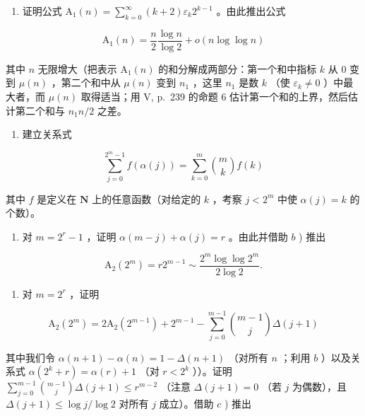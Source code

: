 \begin{enumerate}
\def\labelenumi{\alph{enumi})}
\tightlist
\item
  证明公式 \(\mathrm{A}_1(n) = \sum_{k=0}^{\infty}(k+2)\varepsilon_k 2^{k-1}\) 。由此推出公式
\end{enumerate}

\[
\mathrm{A} _ {1} (n) = \frac {n}{2} \frac {\log n}{\log 2} + o (n \log \log n)
\]

其中 \(n\) 无限增大（把表示 \(\mathrm{A}_1(n)\) 的和分解成两部分：第一个和中指标 \(k\) 从 0 变到 \(\mu(n)\) ，第二个和中从 \(\mu(n)\) 变到 \(n_1\) ，这里 \(n_1\) 是数 \(k\) （使 \(\varepsilon_k \neq 0\) ）中最大者，而 \(\mu(n)\) 取得适当；用 V, p.~239 的命题 6 估计第一个和的上界，然后估计第二个和与 \(n_1n / 2\) 之差。

\begin{enumerate}
\def\labelenumi{\alph{enumi})}
\setcounter{enumi}{1}
\tightlist
\item
  建立关系式
\end{enumerate}

\[
\sum_ {j = 0} ^ {2 ^ {m} - 1} f (\alpha (j)) = \sum_ {k = 0} ^ {m} \binom {m} {k} f (k)
\]

其中 \(f\) 是定义在 \(\mathbf{N}\) 上的任意函数（对给定的 \(k\) ，考察 \(j < 2^{m}\) 中使 \(\alpha(j) = k\) 的个数）。

\begin{enumerate}
\def\labelenumi{\alph{enumi})}
\setcounter{enumi}{2}
\tightlist
\item
  对 \(m = 2^r - 1\) ，证明 \(\alpha(m - j) + \alpha(j) = r\) 。由此并借助 \(b\) ) 推出
\end{enumerate}

\[
\mathrm{A} _ {2} (2 ^ {m}) = r 2 ^ {m - 1} \sim \frac {2 ^ {m} \log \log 2 ^ {m}}{2 \log 2}.
\]

\begin{enumerate}
\def\labelenumi{\alph{enumi})}
\setcounter{enumi}{3}
\tightlist
\item
  对 \(m = 2^{r}\) ，证明
\end{enumerate}

\[
\mathrm{A} _ {2} (2 ^ {m}) = 2 \mathrm{A} _ {2} (2 ^ {m - 1}) + 2 ^ {m - 1} - \sum_ {j = 0} ^ {m - 1} \binom {m - 1} {j} \Delta (j + 1)
\]

其中我们令 \(\alpha(n+1)-\alpha(n)=1-\Delta(n+1)\) （对所有 \(n\) ；利用 \(b\) ）以及关系式 \(\alpha(2^{k}+r)=\alpha(r)+1\) （对 \(r<2^{k}\) ））。证明 \(\sum_{j=0}^{m-1}\binom{m-1}{j}\Delta(j+1)\leqslant r^{m-2}\) （注意 \(\Delta(j+1)=0\) （若 \(j\) 为偶数），且 \(\Delta(j+1)\leqslant\log j/\log 2\) 对所有 \(j\) 成立）。借助 \(c\) ) 推出

